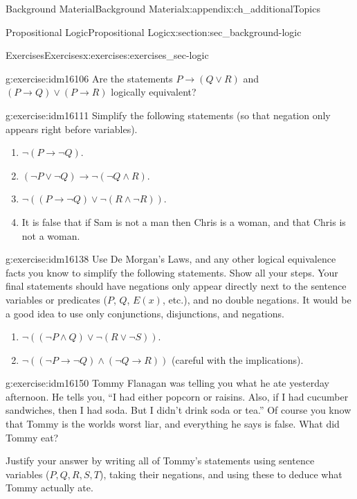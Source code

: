 \documentclass[oneside,10pt,]{book}
\numberwithin{equation}{chapter}
\def\imp{\rightarrow}
\begin{document}
\begin{appendixptx}{Background Material}{}{Background Material}{}{}{x:appendix:ch_additionalTopics}
\begin{sectionptx}{Propositional Logic}{}{Propositional Logic}{}{}{x:section:sec_background-logic}
\begin{exercises-subsection}{Exercises}{}{Exercises}{}{}{x:exercises:exercises_sec-logic}
\begin{divisionexercise}{6}{}{}{g:exercise:idm16106}
Are the statements \(P \imp (Q\vee R)\) and \((P \imp Q) \vee (P \imp R)\) logically equivalent?%
\end{divisionexercise}%
\begin{divisionexercise}{7}{}{}{g:exercise:idm16111}%
Simplify the following statements (so that negation only appears right before variables).%
\par
%
\begin{enumerate}[label=(\alph*)]
\item{}\(\neg(P \imp \neg Q)\).%
\item{}\((\neg P \vee \neg Q) \imp \neg (\neg Q \wedge R)\).%
\item{}\(\neg((P \imp \neg Q) \vee \neg (R \wedge \neg R))\).%
\item{}It is false that if Sam is not a man then Chris is a woman, and that Chris is not a woman.%
\end{enumerate}
%
\end{divisionexercise}%
\begin{divisionexercise}{8}{}{}{g:exercise:idm16138}%
Use De Morgan's Laws, and any other logical equivalence facts you know to simplify the following statements. Show all your steps. Your final statements should have negations only appear directly next to the sentence variables or predicates (\(P\), \(Q\), \(E(x)\), etc.), and no double negations. It would be a good idea to use only conjunctions, disjunctions, and negations.%
\par
%
\begin{enumerate}[label=(\alph*)]
\item{}\(\neg((\neg P \wedge Q) \vee \neg(R \vee \neg S))\). %
\item{}\(\neg((\neg P \imp \neg Q) \wedge (\neg Q \imp R))\) (careful with the implications). %
\end{enumerate}
%
\end{divisionexercise}%
\begin{divisionexercise}{9}{}{}{g:exercise:idm16150}%
Tommy Flanagan was telling you what he ate yesterday afternoon. He tells you, ``I had either popcorn or raisins. Also, if I had cucumber sandwiches, then I had soda. But I didn't drink soda or tea.'' Of course you know that Tommy is the worlds worst liar, and everything he says is false. What did Tommy eat?%
\par
Justify your answer by writing all of Tommy's statements using sentence variables (\(P, Q, R, S, T\)), taking their negations, and using these to deduce what Tommy actually ate.%
\end{divisionexercise}%

\end{exercises-subsection}
\end{sectionptx}
\end{appendixptx}
\end{document}
